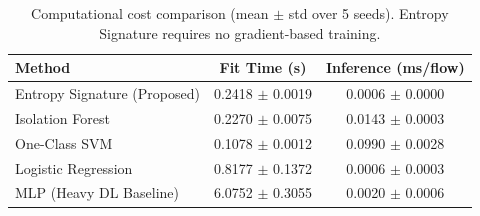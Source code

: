 \begin{table}[t]
\centering
\caption{Computational cost comparison (mean $\pm$ std over 5 seeds). Entropy Signature requires no gradient-based training.}
\label{tab:cost}
\begin{tabular}{lcc}
\toprule
Method & Fit Time (s) & Inference (ms/flow) \\
\midrule
Entropy Signature (Proposed) & 0.2418 $\pm$ 0.0019 & 0.0006 $\pm$ 0.0000 \\
Isolation Forest & 0.2270 $\pm$ 0.0075 & 0.0143 $\pm$ 0.0003 \\
One-Class SVM & 0.1078 $\pm$ 0.0012 & 0.0990 $\pm$ 0.0028 \\
Logistic Regression & 0.8177 $\pm$ 0.1372 & 0.0006 $\pm$ 0.0003 \\
MLP (Heavy DL Baseline) & 6.0752 $\pm$ 0.3055 & 0.0020 $\pm$ 0.0006 \\
\bottomrule
\end{tabular}
\end{table}